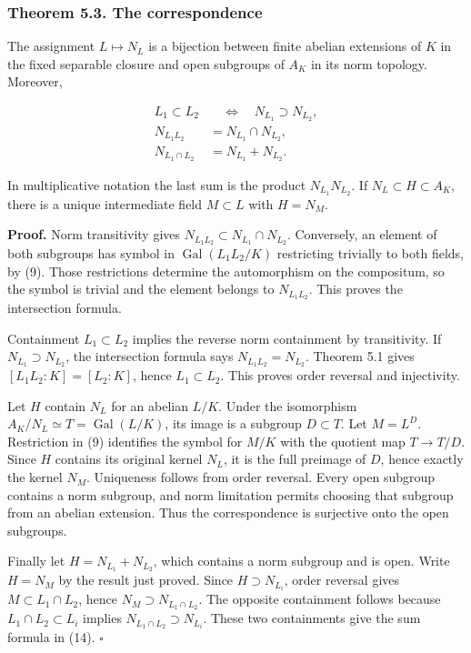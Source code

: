 \documentclass[11pt,a4paper]{article}
\begin{document}
\subsubsection{Theorem 5.3. The
correspondence}\label{theorem-5.3.-the-correspondence}

The assignment \(L\mapsto N_L\) is a bijection between finite abelian
extensions of \(K\) in the fixed separable closure and open subgroups of
\(A_K\) in its norm topology. Moreover,

\[
\begin{aligned}
L_1\subset L_2&\quad\Longleftrightarrow\quad N_{L_1}\supset N_{L_2},\\
N_{L_1L_2}&=N_{L_1}\cap N_{L_2},\\
N_{L_1\cap L_2}&=N_{L_1}+N_{L_2}.
\end{aligned}
\tag{14}
\]

In multiplicative notation the last sum is the product
\(N_{L_1}N_{L_2}\). If \(N_L\subset H\subset A_K\), there is a unique
intermediate field \(M\subset L\) with \(H=N_M\).

\textbf{Proof.} Norm transitivity gives
\(N_{L_1L_2}\subset N_{L_1}\cap N_{L_2}\). Conversely, an element of
both subgroups has symbol in \(\operatorname{Gal}(L_1L_2/K)\)
restricting trivially to both fields, by (9). Those restrictions
determine the automorphism on the compositum, so the symbol is trivial
and the element belongs to \(N_{L_1L_2}\). This proves the intersection
formula.

Containment \(L_1\subset L_2\) implies the reverse norm containment by
transitivity. If \(N_{L_1}\supset N_{L_2}\), the intersection formula
says \(N_{L_1L_2}=N_{L_2}\). Theorem 5.1 gives \([L_1L_2:K]=[L_2:K]\),
hence \(L_1\subset L_2\). This proves order reversal and injectivity.

Let \(H\) contain \(N_L\) for an abelian \(L/K\). Under the isomorphism
\(A_K/N_L\simeq T=\operatorname{Gal}(L/K)\), its image is a subgroup
\(D\subset T\). Let \(M=L^D\). Restriction in (9) identifies the symbol
for \(M/K\) with the quotient map \(T\to T/D\). Since \(H\) contains its
original kernel \(N_L\), it is the full preimage of \(D\), hence exactly
the kernel \(N_M\). Uniqueness follows from order reversal. Every open
subgroup contains a norm subgroup, and norm limitation permits choosing
that subgroup from an abelian extension. Thus the correspondence is
surjective onto the open subgroups.

Finally let \(H=N_{L_1}+N_{L_2}\), which contains a norm subgroup and is
open. Write \(H=N_M\) by the result just proved. Since
\(H\supset N_{L_i}\), order reversal gives \(M\subset L_1\cap L_2\),
hence \(N_M\supset N_{L_1\cap L_2}\). The opposite containment follows
because \(L_1\cap L_2\subset L_i\) implies
\(N_{L_1\cap L_2}\supset N_{L_i}\). These two containments give the sum
formula in (14). \(\square\)
\end{document}
